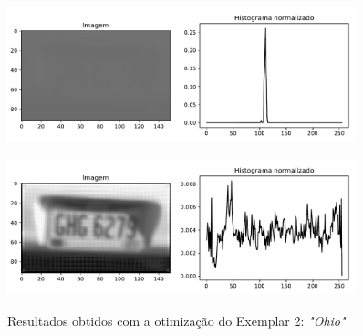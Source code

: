\begin{figure}
	\centering
	\caption{Resultados obtidos com a otimização do Exemplar 2: \emph{"Ohio"}}
	\label{fig:result_histograms1}
	\begin{minipage}[b]{.99\linewidth}
		\includegraphics[width = 0.9\textwidth]{./figures/results_figures/histograma2.pdf}
		\label{fig:result_histograms1_output}
	\end{minipage}	

	\begin{minipage}[b]{.99\linewidth}
		\includegraphics[width = 0.9\textwidth]{./figures/results_figures/histograma1.pdf}
		\label{fig:result_histograms1_equalized}
	\end{minipage}	
	
\end{figure}


